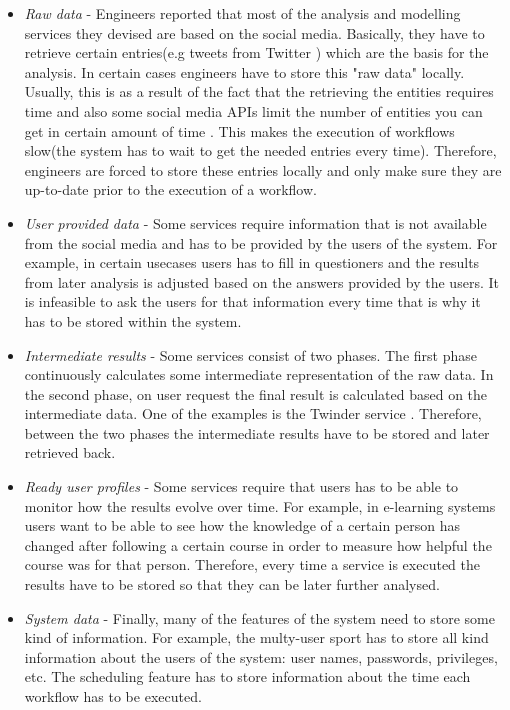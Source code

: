 \begin{itemize}

	\item \textit{Raw data} - Engineers reported that most of the analysis and modelling services they devised are based on the social media. Basically, they have to retrieve certain entries(e.g tweets from Twitter ) which are the basis for the analysis. In certain cases engineers have to store this "raw data" locally. Usually, this is as a result of the fact that the retrieving the entities requires time and also some social media APIs limit the number of entities you can get in certain amount of time \cite{cheong2009integrating}. This makes the execution of workflows slow(the system has to wait to get the needed entries every time). Therefore, engineers are forced to store these entries locally and only make sure they are up-to-date prior to the execution of a workflow.
	
	\item \textit{User provided data} - Some services require information that is not available from the social media and has to be provided by the users of the system. For example, in certain usecases users has to fill in questioners and the results from later analysis is adjusted based on the answers provided by the users. It is infeasible to ask the users for that information every time that is why it has to be stored within the system.
	
	\item \textit{Intermediate results} - Some services consist of two phases. The first phase continuously calculates some intermediate representation of the raw data. In the second phase, on user request the final result is calculated based on the intermediate data. One of the examples is the Twinder service \cite{tao2012twinder}. Therefore, between the two phases the intermediate results have to be stored and later retrieved back.
	
	\item \textit{Ready user profiles} - Some services require that users has to be able to monitor how the results evolve over time. For example, in e-learning systems users want to be able to see how the knowledge of a certain person has changed after following a certain course in order to measure how helpful the course was for that person. Therefore, every time a service is executed the results have to be stored so that they can be later further analysed.
	
	\item \textit{System data} - Finally, many of the features of the system need to store some kind of information. For example, the multy-user sport has to store all kind information about the users of the system: user names, passwords, privileges, etc. The scheduling feature has to store information about the time each workflow has to be executed. 
	
\end{itemize}

